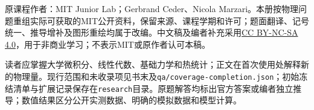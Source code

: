 原课程作者：MIT Junior Lab；Gerbrand Ceder、Nicola Marzari。本册按物理问题重组实际可获取的MIT公开资料，保留来源、课程学期和许可；题面翻译、记号统一、推导增补及图形重绘均属于改编。中文稿及编者补充采用\href{https://creativecommons.org/licenses/by-nc-sa/4.0/}{CC BY-NC-SA 4.0}，用于非商业学习；不表示MIT或原作者认可本稿。

读者应掌握大学微积分、线性代数、基础力学和热统计；正文在首次使用处解释新的物理量。现行范围和未收录项见书末及\texttt{qa/coverage-completion.json}；初始冻结清单与扩展记录保存在\texttt{research}目录。原题解答均标出官方答案或编者独立推导；数值结果区分公开实测数据、明确的模拟数据和模型计算。
